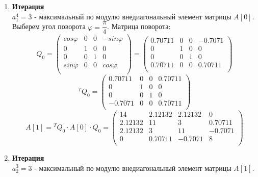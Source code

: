 \documentclass[12pt]{article}
\begin{document}
\begin{enumerate}[label=\textbf{\arabic*}] 
\item \textbf{Итерация} \\
	$a_1^4=3$ - максимальный по модулю внедиагональный элемент матрицы $A[0]$. \\
	Выберем угол поворота $\varphi = \dfrac\pi4$.
	Матрица поворота:
\begin{equation*}
	Q_0 = \left(
	\begin{array}{cccc}
		cos \varphi & 0 & 0 & -sin \varphi \\
		0 & 1 & 0 & 0 \\
		0 & 0 & 1 & 0 \\
		sin \varphi & 0 & 0 & cos \varphi \\
	\end{array}
	\right)
	=
	\left(
	\begin{array}{cccc}
		0.70711 & 0 & 0 & -0.7071 \\
		0 & 1 & 0 & 0 \\
		0 & 0 & 1 & 0 \\
		0.70711 & 0 & 0 & 0.70711 \\
	\end{array}
	\right)
\end{equation*}
\begin{equation*}
	{}^T Q_0 = \left(
	\begin{array}{cccc}
		0.70711 & 0 & 0 & 0.70711 \\
		0 & 1 & 0 & 0 \\
		0 & 0 & 1 & 0 \\
		-0.7071 & 0 & 0 & 0.70711 \\
	\end{array}
	\right)
\end{equation*}
\begin{equation*}
	A[1] = {}^T Q_0 \cdot A[0] \cdot Q_0 = \left(
	\begin{array}{cccc}
		14 & 2.12132 & 2.12132 & 0 \\
		2.12132 & 11 & 3 & 0.70711 \\
		2.12132 & 3 & 11 & -0.7071 \\
		0 & 0.70711 & -0.7071 & 8 \\
	\end{array}
	\right)
\end{equation*}
\item \textbf{Итерация} \\
$a_2^3=3$ - максимальный по модулю внедиагональный элемент матрицы $A[1]$. \\

\end{enumerate}
\end{document}
